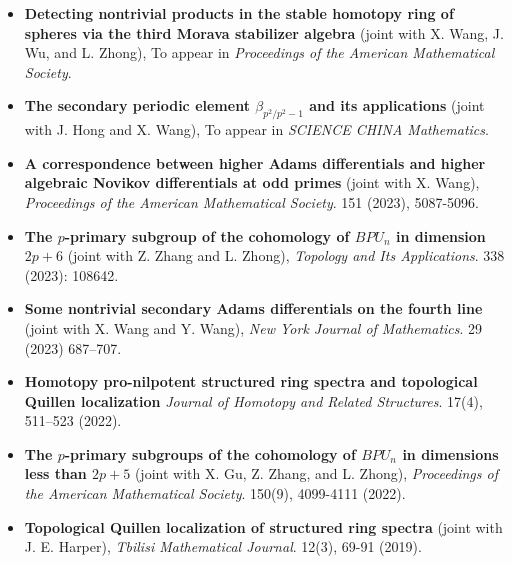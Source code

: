 \documentclass[12pt,a4paper,sans,fontset=windows]{moderncv} %
\begin{document}
\begin{itemize}[wide=30pt, leftmargin=*]
    \item \textbf{Detecting nontrivial products in the stable homotopy ring of spheres via the third Morava stabilizer algebra}
        \newline (joint with X. Wang, J. Wu, and L. Zhong), To appear in \textit{Proceedings of the American Mathematical Society}.
    \item \textbf{The secondary periodic element $\beta_{p^2/p^2-1}$ and its applications}
        \newline (joint with J. Hong and X. Wang), To appear in \textit{SCIENCE CHINA Mathematics}.  
    \item \textbf{A correspondence between higher Adams differentials and higher algebraic Novikov differentials at odd primes}
        \newline (joint with X. Wang), \textit{Proceedings of the American Mathematical Society}. 151 (2023), 5087-5096.
    \item \textbf{The $p$-primary subgroup of the cohomology of $BPU_n$ in dimension $2p+6$}
        \newline (joint with Z. Zhang and L. Zhong), \textit{Topology and Its Applications}.  338 (2023): 108642.
    \item \textbf{Some nontrivial secondary Adams differentials on the fourth line}
        \newline (joint with X. Wang and Y. Wang),  \textit{New York Journal of Mathematics}.  29 (2023) 687–707.
    \item \textbf{Homotopy pro-nilpotent structured ring spectra and topological Quillen localization}
        \newline \textit{Journal of Homotopy and Related Structures}. 17(4), 511–523 (2022).
    \item \textbf{The $p$-primary subgroups of the cohomology of $BPU_n$ in dimensions less than $2p+5$}
        \newline (joint with X. Gu, Z. Zhang, and L. Zhong), \textit{Proceedings of the American Mathematical Society}. 150(9), 4099-4111 (2022). 
    \item \textbf{Topological Quillen localization of structured ring spectra}
        \newline (joint with J. E. Harper), \textit{Tbilisi Mathematical Journal}. 12(3), 69-91 (2019). 
\end{itemize}

\vspace{2pt} 
\end{document}

